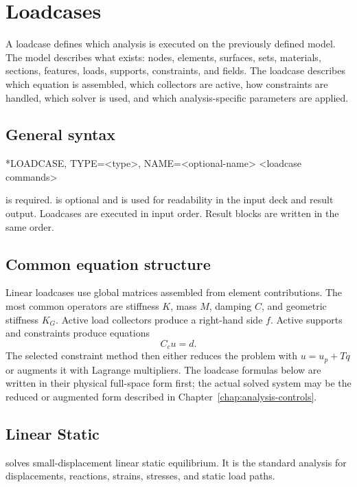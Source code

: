 \chapter{Loadcases}
\label{chap:loadcases}

A loadcase defines which analysis is executed on the previously defined model. The model describes what exists: nodes, elements, surfaces, sets, materials, sections, features, loads, supports, constraints, and fields. The loadcase describes which equation is assembled, which collectors are active, how constraints are handled, which solver is used, and which analysis-specific parameters are applied.

\section{General syntax}

\begin{syntax}
*LOADCASE, TYPE=<type>, NAME=<optional-name>
  <loadcase commands>
\end{syntax}

 is required.  is optional and is used for readability in the input deck and result output. Loadcases are executed in input order. Result blocks are written in the same order.

\section{Common equation structure}

Linear loadcases use global matrices assembled from element contributions. The most common operators are stiffness \(K\), mass \(M\), damping \(C\), and geometric stiffness \(K_G\). Active load collectors produce a right-hand side \(f\). Active supports and constraints produce equations
\[
C_c u = d .
\]
The selected constraint method then either reduces the problem with \(u=u_p+Tq\) or augments it with Lagrange multipliers. The loadcase formulas below are written in their physical full-space form first; the actual solved system may be the reduced or augmented form described in Chapter~\ref{chap:analysis-controls}.

\section{Linear Static}
\label{sec:loadcase-linear-static}

 solves small-displacement linear static equilibrium. It is the standard analysis for displacements, reactions, strains, stresses, and static load paths.

